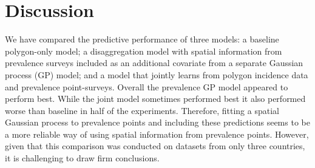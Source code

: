 \documentclass{statsoc}
\begin{document}






\begin{table}
\caption{\label{table3}Summary of coverage of 80\% credible intervals. The proportion of held out data points that fall within their 80\% credible intervals. 
Cases where this is below 0.7 are highlighted in bold.}
\centering
{}
\end{table}


\section*{Discussion}



We have compared the predictive performance of three models: a baseline polygon-only model; a disaggregation model with spatial information from prevalence surveys included as an additional covariate from a separate Gaussian process (GP) model; and a model that jointly learns from polygon incidence data and prevalence point-surveys.
Overall the prevalence GP model appeared to perform best.
While the joint model sometimes performed best it also performed worse than baseline in half of the experiments.
Therefore, fitting a spatial Gaussian process to prevalence points and including these predictions seems to be a more reliable way of using spatial information from prevalence points.
However, given that this comparison was conducted on datasets from only three countries, it is challenging to draw firm conclusions.
\end{document}
